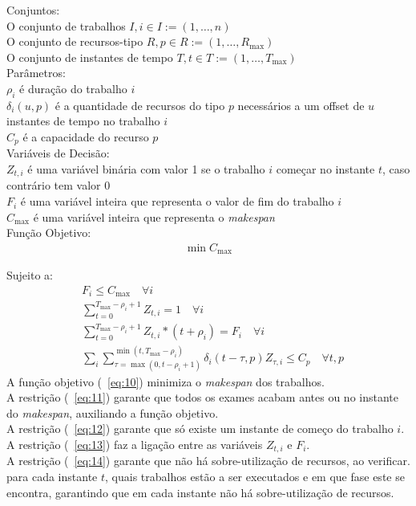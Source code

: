 Conjuntos:\\
O conjunto de trabalhos $I, i \in I := (1, \ldots, n)$ \\
O conjunto de recursos-tipo $R, p \in R := (1, \ldots, R_{\max})$ \\
O conjunto de instantes de tempo $T, t \in T := (1, \ldots, T_{\max})$ \\

Parâmetros:\\
$\rho_{i}$ é duração do trabalho $i$ \\
$\delta_{i}(u,p)$ é a quantidade de recursos do tipo $p$ necessários a um offset de $u$ instantes de tempo no trabalho $i$\\
$C_{p}$ é a capacidade do recurso $p$ \\

Variáveis de Decisão: \\
$Z_{t,i}$ é uma variável binária com valor 1 se o trabalho $i$ começar no instante $t$, caso contrário tem valor 0 \\
$F_{i}$ é uma variável inteira que representa o valor de fim do trabalho $i$ \\
$C_{\max}$ é uma variável inteira que representa o \textit{makespan} \\

Função Objetivo:
\begin{align}
\min C_{\max} \label{eq:10}
\end{align}

Sujeito a:
\begin{align}
&F_{i} \leq C_{\max} \quad \forall i \label{eq:11} \\
&\sum^{T_{\max}-\rho_{i}+1}_{t=0}Z_{t,i} = 1 \quad \forall i \label{eq:12} \\
&\sum^{T_{\max}-\rho_{i}+1}_{t=0}Z_{t,i}*(t+\rho_{i}) = F_{i} \quad \forall i \label{eq:13} \\
&\sum_{i}\sum^{\min(t, T_{\max}-\rho_{i})}_{\tau=\max(0, t-\rho_{i}+1)}\delta_{i}(t-\tau,p)Z_{\tau,i} \leq C_{p} \quad \forall t,p \label{eq:14}
\end{align}
A função objetivo (~\ref{eq:10}) minimiza o \textit{makespan} dos trabalhos.\\
A restrição (~\ref{eq:11}) garante que todos os exames acabam antes ou no instante do \textit{makespan}, auxiliando a função objetivo.\\
A restrição (~\ref{eq:12}) garante que só existe um instante de começo do trabalho $i$.\\
A restrição (~\ref{eq:13}) faz a ligação entre as variáveis $Z_{t,i}$ e $F_{i}$.\\
A restrição (~\ref{eq:14}) garante que não há sobre-utilização de recursos, ao verificar. para cada instante $t$, quais trabalhos estão a ser executados e em que fase este se encontra, garantindo que em cada instante não há sobre-utilização de recursos.\\

